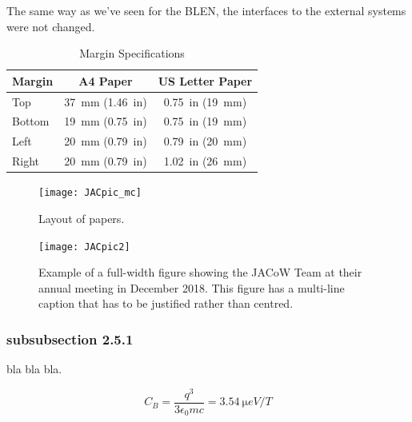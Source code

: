 \documentclass[letter,
               biblatex,     %
               keeplastbox,   %
               ]{jacow}
\begin{document}
The same way as we've seen for the BLEN, the interfaces to the external systems were not changed.

\begin{table}[!hbt]
   \centering
   \caption{Margin Specifications}
   \begin{tabular}{lcc}
       \toprule
       \textbf{Margin} & \textbf{A4 Paper}                      & \textbf{US Letter Paper} \\
       \midrule
           Top         & \SI{37}{mm} (\SI{1.46}{in})            & \SI{0.75}{in} (\SI{19}{mm})        \\ %
          Bottom       & \SI{19}{mm} (\SI{0.75}{in})            & \SI{0.75}{in} (\SI{19}{mm})        \\ %
           Left        & \SI{20}{mm} (\SI{0.79}{in})            & \SI{0.79}{in} (\SI{20}{mm})        \\ %
           Right       & \SI{20}{mm} (\SI{0.79}{in})            & \SI{1.02}{in} (\SI{26}{mm})        \\
       \bottomrule
   \end{tabular}
   \label{tab:margins}
\end{table}


\begin{figure}[!htb]
   \centering
   \texttt{[image: JACpic\_mc]}
   \caption{Layout of papers.}
   \label{fig:paper_layout}
\end{figure}

\begin{figure}[!tbh]
    \centering
    \texttt{[image: JACpic2]}

    \caption{Example of a full-width figure showing the JACoW Team at their annual
    	     meeting in December 2018. This figure has a multi-line caption that has to be
    	     justified rather than centred.} %
    \label{fig:jacow_team}
\end{figure}



\subsubsection{subsubsection 2.5.1} bla bla bla.



\begin{equation}\label{eq:label}
    C_B=\frac{q^3}{3\epsilon_{0} mc}=\SI{3.54}{\micro eV/T}
\end{equation}
\end{document}
